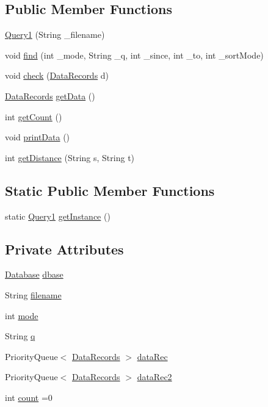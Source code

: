 \subsection*{Public Member Functions}
\begin{DoxyCompactItemize}
\item 
\hyperlink{classQuery1_aca728525a5aaf4f2a993a414eb4495b2}{Query1} (String \+\_\+filename)
\item 
void \hyperlink{classQuery1_a13c86103ce4bda48db0a398a7d7d107c}{find} (int \+\_\+mode, String \+\_\+q, int \+\_\+since, int \+\_\+to, int \+\_\+sort\+Mode)
\item 
void \hyperlink{classQuery1_a5c7f9b2155dfe6bde03c6579fb00b61a}{check} (\hyperlink{classDataRecords}{Data\+Records} d)
\item 
\hyperlink{classDataRecords}{Data\+Records} \hyperlink{classQuery1_a3590292b24792c860c2dedb170683497}{get\+Data} ()
\item 
int \hyperlink{classQuery1_a6c3cfaf81d41e28b40f835d533865182}{get\+Count} ()
\item 
void \hyperlink{classQuery1_a4ac5185895a11f7dd7906a22d8854caf}{print\+Data} ()
\item 
int \hyperlink{classQuery1_a1fe6a57adb424a935bedb8a7ca6cf40f}{get\+Distance} (String s, String t)
\end{DoxyCompactItemize}
\subsection*{Static Public Member Functions}
\begin{DoxyCompactItemize}
\item 
static \hyperlink{classQuery1}{Query1} \hyperlink{classQuery1_a2b63c437c3dbe7c615254a629bdd742f}{get\+Instance} ()
\end{DoxyCompactItemize}
\subsection*{Private Attributes}
\begin{DoxyCompactItemize}
\item 
\hyperlink{classDatabase}{Database} \hyperlink{classQuery1_af7fea4172dbe6f682854a92fed28e583}{dbase}
\item 
String \hyperlink{classQuery1_a747a19c9f4b24c9c47f7c7f13e8932e7}{filename}
\item 
int \hyperlink{classQuery1_a91868e1771a4ea60d950ffd61c56827d}{mode}
\item 
String \hyperlink{classQuery1_acaa7bb7db670b4e6ffce9380b960b9e3}{q}
\item 
Priority\+Queue$<$ \hyperlink{classDataRecords}{Data\+Records} $>$ \hyperlink{classQuery1_a418a5ab9b0660ea8b3c5481beb385bbc}{data\+Rec}
\item 
Priority\+Queue$<$ \hyperlink{classDataRecords}{Data\+Records} $>$ \hyperlink{classQuery1_ace614dbbc820194d2c7092827b9c2491}{data\+Rec2}
\item 
int \hyperlink{classQuery1_a916bfb3d18a8fa0663bfc9728d40961f}{count} =0
\end{DoxyCompactItemize}
